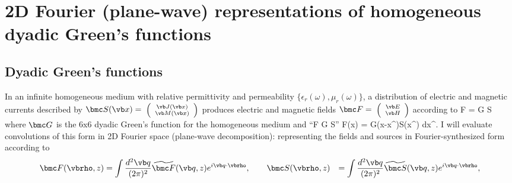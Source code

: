 \documentclass[letterpaper]{article}
\renewcommand{\wt}{\widetilde}
\begin{document}
\appendix
\newpage
\section{2D Fourier (plane-wave) representations of
         homogeneous dyadic Green's functions}

\subsection*{Dyadic Green's functions}

In an infinite homogeneous medium with relative permittivity and
permeability $\{\epsilon_r(\omega),\mu_r(\omega)\}$,
a distribution of electric and magnetic currents described by
$\bmc S(\vb x)=\hbox{\scriptsize{
 $\left(\begin{array}{c} \vb J(\vb x) \\ \vb M(\vb x)\end{array}\right)$}}$
produces electric and magnetic fields
$\bmc F=\hbox{\scriptsize{
 $\left(\begin{array}{c} \vb E \\ \vb H\end{array}\right)$}}$
according to
{  \bmc F = \bmc G \star \bmc S
}
where $\bmc G$ is the 6x6 dyadic Green's function for the homogeneous
medium and 
{
``\bmc F \equiv \bmc G \star \bmc S''
   \quad \Longrightarrow \quad 
    \bmc F(\vb x) = 
    \int
      \bmc G(\vb x-\vb x^\prime)\cdot \bmc S(\vb x^\prime)
    d\vb x^\prime.
}
I will evaluate convolutions of this form in 2D Fourier space
(plane-wave decomposition): representing the fields and sources
in Fourier-synthesized form according to
\begin{align*}
 \bmc F(\vbrho, z)
&=\int \frac{d^2 \vb q}{(2 \pi)^2} 
  \wt{\bmc F}(\vb q,z) e^{i\vb q \cdot \vbrho},
\qquad
 \bmc S(\vbrho, z)
&=\int \frac{d^2 \vb q}{(2 \pi)^2} 
  \wt{\bmc S}(\vb q,z) e^{i\vb q \cdot \vbrho},
\end{align*}
\end{document}
